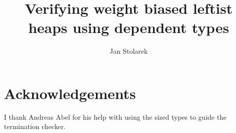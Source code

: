 \documentclass[draft]{llncs}
\begin{document}
\title{Verifying weight biased leftist heaps using dependent types}
\author{Jan Stolarek}



\maketitle







\section*{Acknowledgements}

I thank Andreas Abel for his help with using the sized types to guide the termination checker.


\end{document}
